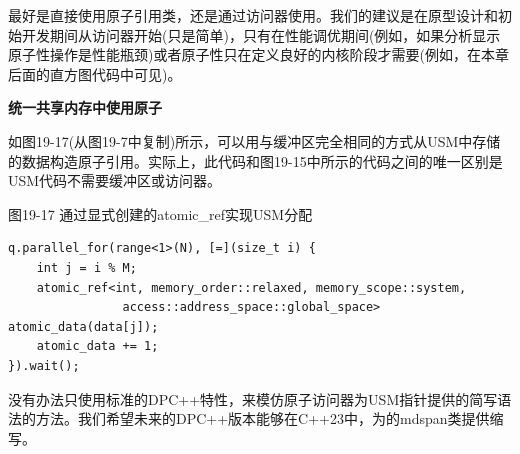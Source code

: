 最好是直接使用原子引用类，还是通过访问器使用。我们的建议是在原型设计和初始开发期间从访问器开始(只是简单)，只有在性能调优期间(例如，如果分析显示原子性操作是性能瓶颈)或者原子性只在定义良好的内核阶段才需要(例如，在本章后面的直方图代码中可见)。\par

\hspace*{\fill} \par %
\textbf{统一共享内存中使用原子}

如图19-17(从图19-7中复制)所示，可以用与缓冲区完全相同的方式从USM中存储的数据构造原子引用。实际上，此代码和图19-15中所示的代码之间的唯一区别是USM代码不需要缓冲区或访问器。\par

\hspace*{\fill} \par %
图19-17 通过显式创建的atomic\_ref实现USM分配
\begin{lstlisting}[caption={}]
q.parallel_for(range<1>(N), [=](size_t i) {
	int j = i % M;
	atomic_ref<int, memory_order::relaxed, memory_scope::system,
				access::address_space::global_space> atomic_data(data[j]);
	atomic_data += 1;
}).wait();
\end{lstlisting}

没有办法只使用标准的DPC++特性，来模仿原子访问器为USM指针提供的简写语法的方法。我们希望未来的DPC++版本能够在C++23中，为的mdspan类提供缩写。\par
























